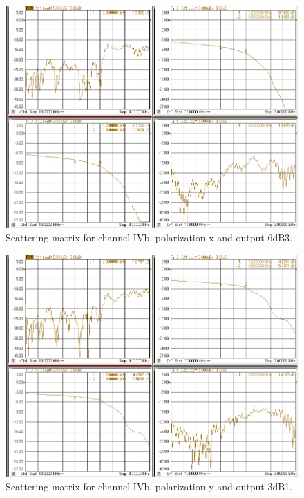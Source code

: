 \documentclass[12pt,a4paper,oneside]{article}
\begin{document}
\begin{figure}[H]
\centering
\includegraphics[width=0.9\linewidth]{VNA_results/IVbx_6dB3.png}
\caption{Scattering matrix for channel IVb, polarization x and output 6dB3.}
\label{fig:IVbx_6dB3}
\end{figure}


\begin{figure}[H]
\centering
\includegraphics[width=0.9\linewidth]{VNA_results/IVby_3dB1.png}
\caption{Scattering matrix for channel IVb, polarization y and output 3dB1.}
\label{fig:IVby_3dB1}
\end{figure}
\end{document}
